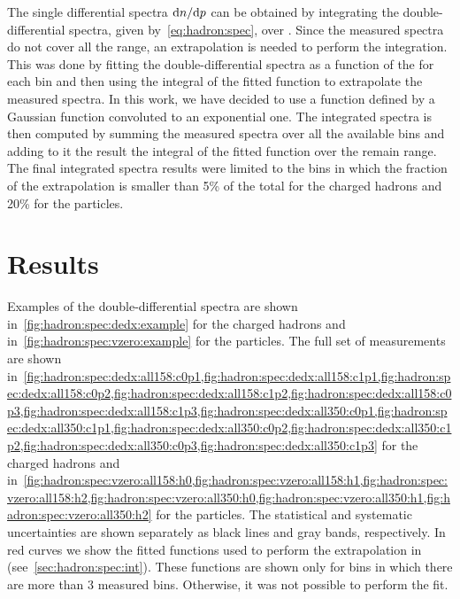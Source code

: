 The single differential spectra $\text{d}n/\text{d}p$ can be obtained
by integrating the double-differential spectra,
given by~\cref{eq:hadron:spec}, over \pT. Since the measured
spectra do not cover all the \pT range, an extrapolation is needed
to perform the integration. This was done by fitting
the double-differential spectra as a function of the \pT for each \pp bin
and then using the integral of the fitted function to
extrapolate the measured spectra.  
In this work, we have decided to use a function
defined by a Gaussian function convoluted to
an exponential one. 
The \pT integrated spectra is then computed by summing
the measured spectra over all the available \pT bins
and adding to it the result the integral of the fitted function
over the remain \pT range. The final \pT integrated spectra results
were limited to the \pp bins in which the fraction of the extrapolation
is smaller than 5\% of the total for the charged hadrons and 20\% for the \vzero particles.


\section{\boldmath Results}
\label{sec:hadron:results}

Examples of the double-differential spectra are shown
in~\cref{fig:hadron:spec:dedx:example} for the charged hadrons
and in~\cref{fig:hadron:spec:vzero:example}
for the \vzero particles. The full set of measurements
are shown
in~\cref{fig:hadron:spec:dedx:all158:c0p1,fig:hadron:spec:dedx:all158:c1p1,fig:hadron:spec:dedx:all158:c0p2,fig:hadron:spec:dedx:all158:c1p2,fig:hadron:spec:dedx:all158:c0p3,fig:hadron:spec:dedx:all158:c1p3,fig:hadron:spec:dedx:all350:c0p1,fig:hadron:spec:dedx:all350:c1p1,fig:hadron:spec:dedx:all350:c0p2,fig:hadron:spec:dedx:all350:c1p2,fig:hadron:spec:dedx:all350:c0p3,fig:hadron:spec:dedx:all350:c1p3}
for the charged hadrons and
in~\cref{fig:hadron:spec:vzero:all158:h0,fig:hadron:spec:vzero:all158:h1,fig:hadron:spec:vzero:all158:h2,fig:hadron:spec:vzero:all350:h0,fig:hadron:spec:vzero:all350:h1,fig:hadron:spec:vzero:all350:h2}
for the \vzero particles.
The statistical and systematic uncertainties are shown
separately as black lines and gray bands, respectively.
In red curves we show the fitted functions used to perform
the extrapolation in \pT (see~\cref{sec:hadron:spec:int}).
These functions are shown only for \pp bins in which
there are more than 3 measured \pT bins. Otherwise,
it was not possible to perform the fit.


